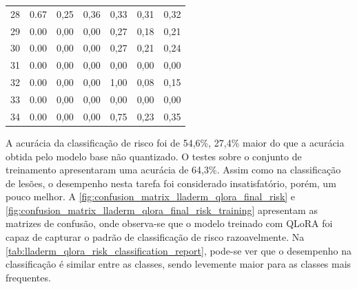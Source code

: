 \begin{table}[ht]
\begin{tabular}{l|c|c|c|c|c|c}
        28    & 0.67                                    & 0,25                                        & 0,36      &
        0,33  & 0,31                                    & 0,32                                                      \\
        29    & 0.00                                    & 0,00                                        & 0,00      &
        0,27  & 0,18                                    & 0,21                                                      \\
        30    & 0.00                                    & 0,00                                        & 0,00      &
        0,27  & 0,21                                    & 0,24                                                      \\
        31    & 0.00                                    & 0,00                                        & 0,00      &
        0,00  & 0,00                                    & 0,00                                                      \\
        32    & 0.00                                    & 0,00                                        & 0,00      &
        1,00  & 0,08                                    & 0,15                                                      \\
        33    & 0.00                                    & 0,00                                        & 0,00      &
        0,00  & 0,00                                    & 0,00                                                      \\
        34    & 0.00                                    & 0,00                                        & 0,00      &
        0,75  & 0,23                                    & 0,35                                                      \\
        \hline
    \end{tabular}
    \label{tab:lladerm_qlora_skin_lesion_classification_report}
\end{table}

A acurácia da classificação de risco foi de 54,6\%, 27,4\% maior do que a acurácia obtida pelo modelo base não
quantizado. O testes sobre o conjunto de treinamento apresentaram uma acurácia de 64,3\%. Assim como na classificação
de lesões, o desempenho nesta tarefa foi considerado insatisfatório, porém, um pouco melhor. A
\autoref{fig:confusion_matrix_lladerm_qlora_final_risk} e
\autoref{fig:confusion_matrix_lladerm_qlora_final_risk_training} apresentam as matrizes de confusão, onde observa-se
que o modelo treinado com \ac{QLoRA} foi capaz de capturar o padrão de classificação de risco razoavelmente. Na
\autoref{tab:lladerm_qlora_risk_classification_report}, pode-se ver que o desempenho na classificação é similar entre
as classes, sendo levemente maior para as classes mais frequentes.


